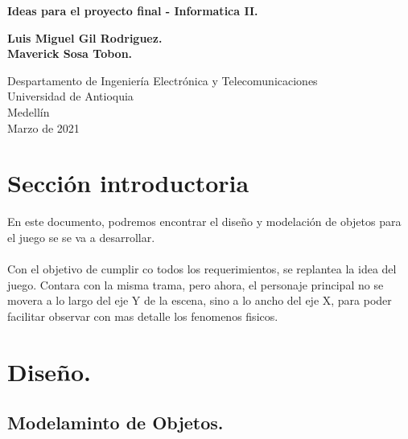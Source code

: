 \documentclass{article}
\begin{document}
\begin{titlepage}
    \begin{center}
        \vspace*{1cm}
            
        \Huge
        \textbf{Ideas para el proyecto final - Informatica II.}
            
        \vspace{0.5cm}
        \LARGE
            
        \vspace{1.5cm}
            
        \textbf{Luis Miguel Gil Rodriguez.}
        \\
        \textbf{Maverick Sosa Tobon.}
        \vfill
        \vspace{0.8cm}
            
        \Large
        Despartamento de Ingeniería Electrónica y Telecomunicaciones\\
        Universidad de Antioquia\\
        Medellín\\
        Marzo de 2021
            
    \end{center}
\end{titlepage}
\tableofcontents
\newpage
\section{Sección introductoria} \label{intro}
En este documento, podremos encontrar el diseño y modelación de objetos para el juego se se va a desarrollar.
\\
\\
Con el objetivo de cumplir co todos los requerimientos, se replantea la idea del juego. Contara con la misma trama, pero ahora, el personaje principal no se movera a lo largo del eje Y de la escena, sino a lo ancho del eje X, para poder facilitar observar con mas detalle los fenomenos fisicos.
\section{Diseño.}
\subsection{Modelaminto de Objetos.}
\end{document}
